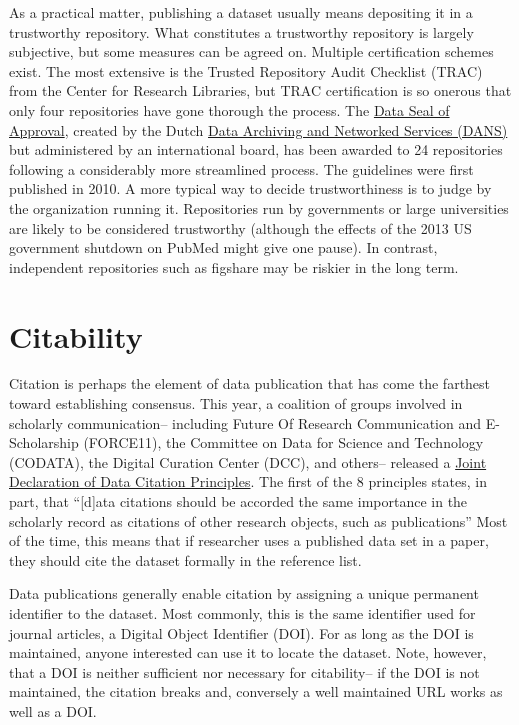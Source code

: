 \documentclass[10pt,twocolumn]{article}
\begin{document}
As a practical matter, publishing a dataset usually means depositing it in a trustworthy repository.
What constitutes a trustworthy repository is largely subjective, but some measures can be agreed on.
Multiple certification schemes exist.
The most extensive is the Trusted Repository Audit Checklist (TRAC)\cite{dale_trustworthy_2007} from the Center for Research Libraries, but TRAC certification is so onerous that only four repositories have gone thorough the process.
The \href{http://datasealofapproval.org/}{Data Seal of Approval}, created by the Dutch \href{http://www.dans.knaw.nl/en}{Data Archiving and Networked Services (DANS)} but administered by an international board, has been awarded to 24 repositories following a considerably more streamlined process.
The guidelines were first published in 2010.
A more typical way to decide trustworthiness is to judge by the organization running it.
Repositories run by governments or large universities are likely to be considered trustworthy (although the effects of the 2013 US government shutdown on PubMed might give one pause).
In contrast, independent repositories such as figshare may be riskier in the long term. %

\section*{Citability}\label{citability}

Citation is perhaps the element of data publication that has come the farthest toward establishing consensus.
This year, a coalition of groups involved in scholarly communication– including Future Of Research Communication and E-Scholarship (FORCE11)\cite{bourne_improving_2012}, the Committee on Data for Science and Technology (CODATA)\cite{codata-icsti_task_group_on_data_citation_standards_and_practices_out_2013}, the Digital Curation Center (DCC), and others– released a \href{http://www.force11.org/datacitation}{Joint Declaration of Data Citation Principles}.
The first of the 8 principles states, in part, that ``[d]ata citations should be accorded the same importance in the scholarly record as citations of other research objects, such as publications''
Most of the time, this means that if researcher uses a published data set in a paper, they should cite the dataset formally in the reference list.
	
Data publications generally enable citation by assigning a unique permanent identifier to the dataset.
Most commonly, this is the same identifier used for journal articles, a Digital Object Identifier (DOI).
For as long as the DOI is maintained, anyone interested can use it to locate the dataset.
Note, however, that a DOI is neither sufficient nor necessary for citability-- if the DOI is not maintained, the citation breaks and, conversely a well maintained URL works as well as a DOI.
\end{document}
